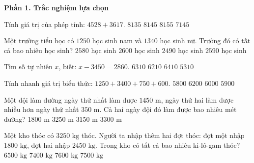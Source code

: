\textbf{Phần 1. Trắc nghiệm lựa chọn}

\begin{ex} %
Tính giá trị của phép tính: $4528 + 3617$.
\choice
{$8135$}
{\True $8145$}
{$8155$}
{$7145$}
\end{ex}

\begin{ex} %
Một trường tiểu học có $1250$ học sinh nam và $1340$ học sinh nữ. Trường đó có tất cả bao nhiêu học sinh?
\choice
{$2580$ học sinh}
{$2600$ học sinh}
{$2490$ học sinh}
{\True $2590$ học sinh}
\end{ex}

\begin{ex} %
Tìm số tự nhiên $x$, biết: $x - 3450 = 2860$.
\choice
{\True $6310$}
{$6210$}
{$6410$}
{$5310$}
\end{ex}

\begin{ex} %
Tính nhanh giá trị biểu thức: $1250 + 3400 + 750 + 600$.
\choice
{$5800$}
{$6200$}
{\True $6000$}
{$5900$}
\end{ex}

\begin{ex} %
Một đội làm đường ngày thứ nhất làm được $1450\text{ m}$, ngày thứ hai làm được nhiều hơn ngày thứ nhất $350\text{ m}$. Cả hai ngày đội đó làm được bao nhiêu mét đường?
\choice
{$1800\text{ m}$}
{\True $3250\text{ m}$}
{$3150\text{ m}$}
{$3300\text{ m}$}
\end{ex}

\begin{ex} %
Một kho thóc có $3250\text{ kg}$ thóc. Người ta nhập thêm hai đợt thóc: đợt một nhập $1800\text{ kg}$, đợt hai nhập $2450\text{ kg}$. Trong kho có tất cả bao nhiêu ki-lô-gam thóc?
\choice
{$6500\text{ kg}$}
{$7400\text{ kg}$}
{$7600\text{ kg}$}
{\True $7500\text{ kg}$}
\end{ex}

